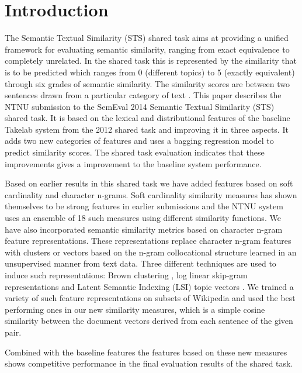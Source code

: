 \section{Introduction}
\label{intro}


The Semantic Textual Similarity (STS) shared task aims at providing a unified framework for evaluating semantic similarity, ranging from exact equivalence to completely unrelated. In the shared task this is represented by the similarity that is to be predicted which ranges from 0 (different topics) to 5 (exactly equivalent) through six grades of semantic similarity. The similarity scores are between two sentences drawn from a particular category of text \cite{agirre-EtAl:2013:*SEM1}.
This paper describes the NTNU submission to the SemEval 2014 Semantic Textual Similarity (STS) shared task. It is based on the lexical and distributional features of the baseline Takelab system from the 2012 shared task and improving it in three aspects. It adds two new categories of features and uses a bagging regression model to predict similarity scores. The shared task evaluation indicates that these improvements gives a improvement to the baseline system performance.

Based on earlier results in this shared task we have added features based on soft cardinality and character n-grams. Soft cardinality similarity measures has shown themselves to be strong features in earlier submissions \cite{jimenez_softcardinality-core:_2013} and the NTNU system uses an ensemble of 18 such measures using different similarity functions.
We have also incorporated semantic similarity metrics based on character n-gram feature representations. These representations replace character n-gram features with clusters or vectors based on the n-gram collocational structure learned in an unsupervised manner from text data. Three different techniques are used to induce such representations: Brown clustering \cite{brown1992class}, log linear skip-gram representations \cite{mikolov2013efficient} and Latent Semantic Indexing (LSI) topic vectors \cite{deerwester1990indexing}. We trained a variety of such feature representations on subsets of Wikipedia and used the best performing ones in our new similarity measures, which is a simple cosine similarity between the document vectors derived from each sentence of the given pair.

Combined with the baseline features the features based on these new measures shows competitive performance in the final evaluation results of the shared task.

